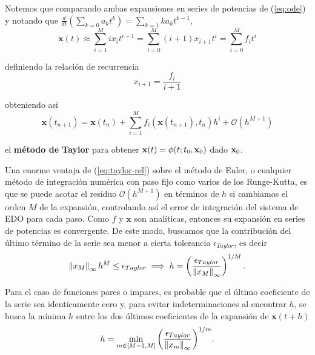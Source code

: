 Notemos que comparando ambas expansiones en series de potencias de (\ref{eq:ode}) y notando que $ \frac{d}{dt} \left( \sum_{k=0} a_k t^k \right) = \sum_{k=1} k a_k t^{k-1}$,   
\begin{equation*}
 \dot{\mathbf{x}}(t) \approx \sum_{i=1}^M i x_i t^{i-1} = \sum_{i=0}^M (i+1)x_{i+1} t^i = \sum_{i=0}^M f_i t^i
\end{equation*}

definiendo la relación de recurrencia
\begin{equation}
x_{i+1} = \frac{f_i}{i+1}
\label{eq:rec-rel}
\end{equation}

obteniendo así 
\begin{equation}
\mathbf{x}(t_{n+1}) = \mathbf{x}(t_n) + \sum_{i=1}^M f_i(\mathbf{x}(t_{n+1}),t_n)h^i + \mathcal{O}(h^{M+1})
\label{eq:taylor-rel}
\end{equation}

el \textbf{método de Taylor} para obtener $\mathbf{x}(t) = \phi(t;t_0,\mathbf{x}_0)$ dado $\mathbf{x}_0$.

Una enorme ventaja de (\ref{eq:taylor-rel}) sobre el método de Euler, o cualquier método de integración numérica con paso fijo como varios de los Runge-Kutta, es que se puede acotar el residuo $\mathcal{O}(h^{M+1})$ en términos de $h$ si cambiamos el orden $M$ de la expansión, controlando así el error de integración del sistema de EDO para cada paso. Como $f$ y $\mathbf{x}$ son analíticas, entonces su expansión en series de potencias es convergente. De este modo, buscamos que la contribución del último término de la serie sea menor a cierta tolerancia $\epsilon_{Taylor}$, es decir
\begin{equation*}
\left\lVert x_M\right\rVert_\infty h^M \leq \epsilon_{Taylor} \implies h = \left( \frac{\epsilon_{Taylor}}{\left\lVert x_M\right\rVert_\infty} \right)^{1/M}.
\end{equation*} 

Para el caso de funciones pares o impares, es probable que el último coeficiente de la serie sea identicamente cero y, para evitar indeterminaciones al encontrar $h$, se busca la mínima $h$ entre los dos últimos coeficientes de la expansión de $\mathbf{x}(t+h)$
\begin{equation}
h = \min_{m \in [M-1,M]}{ \left( \frac{\epsilon_{Taylor}}{\left\lVert x_m\right\rVert_\infty} \right)^{1/m} }.
\label{eq:stepsize}
\end{equation} 

